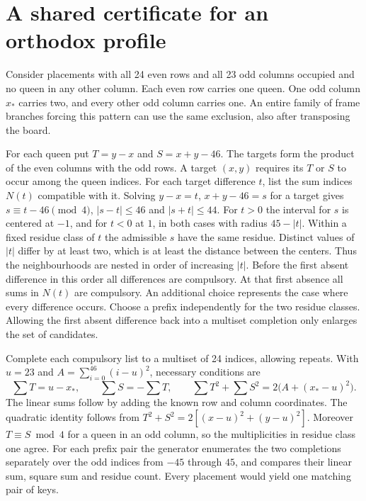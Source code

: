 \documentclass[11pt]{article}
\begin{document}
\section{A shared certificate for an orthodox profile}\label{sec:orthodox}
Consider placements with all 24 even rows and all 23 odd columns occupied
and no queen in any other column. Each even row carries one queen. One
odd column $x_*$ carries two, and every other odd column carries one.
An entire family of frame branches forcing this pattern can use the
same exclusion, also after transposing the board.

For each queen put $T=y-x$ and $S=x+y-46$. The targets form the product
of the even columns with the odd rows. A target $(x,y)$ requires its
$T$ or $S$ to occur among the queen indices. For each target difference
$t$, list the sum indices $N(t)$ compatible with it. Solving $y-x=t$, $x+y-46=s$ for a target gives
$s\equiv t-46\pmod4$, $|s-t|\le46$ and $|s+t|\le44$.
For $t>0$ the interval for $s$ is centered at $-1$, and for $t<0$
at $1$, in both cases with radius $45-|t|$. Within a fixed residue
class of $t$ the admissible $s$ have the same residue. Distinct values
of $|t|$ differ by at least two, which is at least the distance between
the centers. Thus the neighbourhoods are nested in order of increasing
$|t|$.
Before the first absent difference in this order all differences are
compulsory. At that first absence all sums in $N(t)$ are compulsory. An
additional choice represents the case where every difference occurs.
Choose a prefix independently for the two residue classes. Allowing the
first absent difference back into a multiset completion only enlarges the
set of candidates.

Complete each compulsory list to a multiset of 24 indices, allowing repeats.
With $u=23$ and $A=\sum_{i=0}^{46}(i-u)^2$, necessary conditions are
\[
 \sum T=u-x_*,\qquad \sum S=-\sum T,\qquad
 \sum T^2+\sum S^2=2\big(A+(x_*-u)^2\big).
\]
The linear sums follow by adding the known row and column coordinates.
The quadratic identity follows from $T^2+S^2=2[(x-u)^2+(y-u)^2]$.
Moreover $T\equiv S\bmod4$ for a queen in an odd column, so the
multiplicities in residue class one agree. For each prefix pair the
generator enumerates the two completions separately over the odd indices
from $-45$ through $45$, and compares their
linear sum, square sum and residue count. Every placement would yield
one matching pair of keys.
\end{document}
